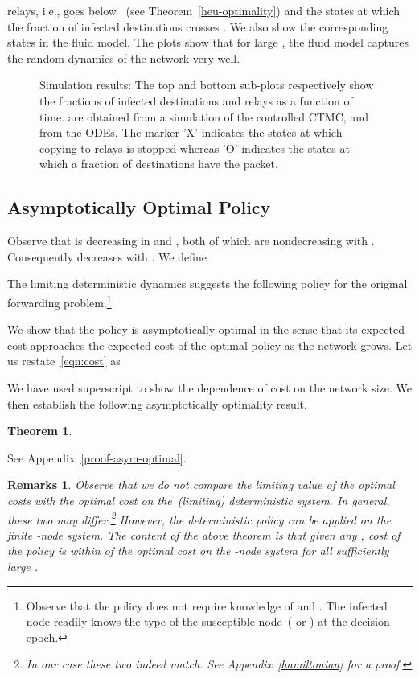 \documentclass[10pt,journal,letterpaper]{IEEEtran}
\newtheorem{theorem}{Theorem}[section]
\newtheorem{remarks}{Remarks}[section]
\newcommand{\remove}[1]{}
\begin{document}
relays, i.e.,  goes below ~(see Theorem~\ref{heu-optimality})
and the states at which the fraction of infected destinations crosses .
We also show the corresponding states in the fluid model.
The plots show that for large , the fluid model captures the random dynamics
of the network very well.
\begin{figure}[t]
\centering
{}
\caption{Simulation results: The top and bottom sub-plots
respectively show the fractions of infected destinations and relays
as a function of time.  are obtained from a
simulation of the controlled CTMC, and  from the ODEs.
The marker 'X' indicates the states at which copying to relays is
stopped whereas 'O' indicates the states at which a fraction 
of destinations have the packet.} \label{fig:kurtz}
\end{figure}

\subsection{Asymptotically Optimal Policy}
Observe that  is decreasing in  and , both of which are nondecreasing with . Consequently
 decreases with . We define

The limiting deterministic dynamics suggests the following policy
 for the original forwarding problem.\footnote{Observe that the policy  does not require
knowledge of  and . The infected node readily knows the type
of the susceptible node~( or ) at the decision epoch.}



We show that the policy  is asymptotically optimal in the sense that
 its expected cost approaches the expected cost of the optimal
policy  as the network grows.
Let us restate~\eqref{eqn:cost} as

We have used superscript  to show the dependence of cost on the
network size. We then establish the following asymptotically optimality result.
\begin{theorem}
\label{theorem:asym-optimal}

\remove{

}
\end{theorem}
\begin{IEEEproof}
See Appendix~\ref{proof-asym-optimal}.
\end{IEEEproof}
\begin{remarks}
\label{remark:cost-comparision}
Observe that we do not compare the limiting value of the optimal costs with the 
optimal cost on the~(limiting) deterministic system. In general, these two may differ.\footnote{In our case these two indeed match. See Appendix~\ref{hamiltonian} for a proof.} 
However, the deterministic policy  can be applied on the finite -node system. 
The content of the above theorem is that given any , cost of the policy  
is within  of the optimal cost {\em on the -node system} for all sufficiently large .
\end{remarks}
\end{document}
